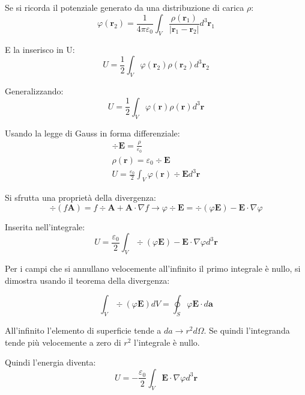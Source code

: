 \documentclass[a4paper]{scrarticle}
\begin{document}
Se si ricorda il potenziale generato da una distribuzione di carica $\rho$:
\begin{equation*}
    \varphi(\bm r_2) = \frac{1}{4\pi\varepsilon_0} \int_{V} \frac{\rho(\bm r_1)}{|\bm r_1 -\bm r_2|} d^3\bm r_1
\end{equation*} 

E la inserisco in U:
\begin{equation*}
    U = \frac{1}{2} \int_V \varphi(\bm r_2)\rho(\bm r_2) d^3\bm r_2
\end{equation*}

Generalizzando:
\begin{equation*}
    U = \frac{1}{2} \int_V \varphi(\bm r)\rho(\bm r) d^3\bm r
\end{equation*}

Usando la legge di Gauss in forma differenziale:
\begin{gather*}
    \div \bm E = \frac{\rho}{\varepsilon_0}\\
    \rho(\bm r) = \varepsilon_0 \div \bm E\\
    U = \frac{\varepsilon_0}{2} \int_V \varphi(\bm r)  \div \bm E d^3\bm r
\end{gather*}

Si sfrutta una proprietà della divergenza:
\begin{equation}
    \div (f \bm A) = f\div \bm A + \bm A \cdot \nabla f \to \varphi \div \bm E = \div (\varphi \bm E) - \bm E \cdot \nabla \varphi
\end{equation}

Inserita nell'integrale:
\begin{equation*}
    U = \frac{\varepsilon_0}{2} \int_V \div (\varphi \bm E) - \bm E \cdot \nabla \varphi d^3\bm r
\end{equation*}

Per i campi che si annullano velocemente all'infinito il primo integrale è nullo, si dimostra usando il teorema della divergenza:

\begin{equation*}
    \int_V \div (\varphi \bm E) dV = \oint_S \varphi \bm E \cdot d \bm a
\end{equation*}

All'infinito l'elemento di superficie tende a $da \to r^2d\Omega$.
Se quindi l'integranda tende più velocemente  a zero di $r^2$ l'integrale è nullo.

Quindi l'energia diventa:
\begin{equation*}
    U = - \frac{\varepsilon_0}{2} \int_{V} \bm E \cdot \nabla \varphi d^3\bm r
\end{equation*}
\end{document}
